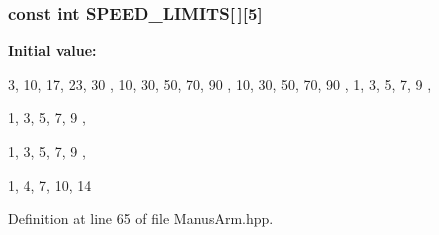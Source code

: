 \subsubsection[{\-S\-P\-E\-E\-D\-\_\-\-L\-I\-M\-I\-T\-S}]{\setlength{\rightskip}{0pt plus 5cm}const int {\bf \-S\-P\-E\-E\-D\-\_\-\-L\-I\-M\-I\-T\-S}[$\,$][5]}\label{ManusArm_8hpp_a48c715826efb7a9627e336881fb9441a}
{\bfseries \-Initial value\-:}
\begin{DoxyCode}
 { { 3, 10, 17, 23, 30 },  
                                                            { 10, 30, 50, 70, 
      90 }, 
                                                            { 10, 30, 50, 70, 
      90 }, 
                                                            { 1, 3, 5, 7, 9 }, 
           
                                                            { 1, 3, 5, 7, 9 }, 
           
                                                            { 1, 3, 5, 7, 9 }, 
           
                                                            { 1, 4, 7, 10, 14 }
       }
\end{DoxyCode}


\-Definition at line 65 of file \-Manus\-Arm.\-hpp.

